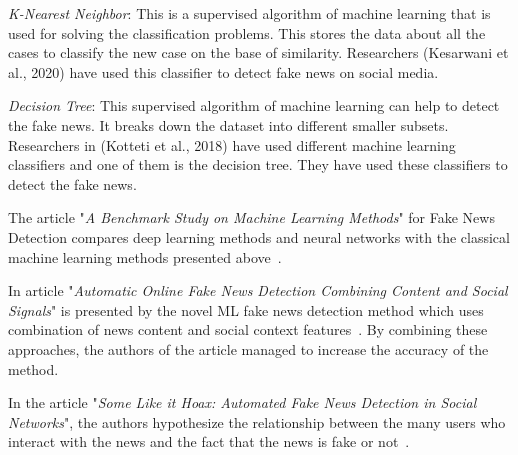 \textit{K-Nearest Neighbor}: This is a supervised algorithm of machine learning that is used for solving the classification problems.
This stores the data about all the cases to classify the new case on the base of similarity.
Researchers (Kesarwani et al., 2020) have used this classifier to detect fake news on social media.

\textit{Decision Tree}: This supervised algorithm of machine learning can help to detect the fake news.
It breaks down the dataset into different smaller subsets.
Researchers in (Kotteti et al., 2018) have used different machine learning classifiers and one of them is the decision tree.
They have used these classifiers to detect the fake news.

The article "\textit{A Benchmark Study on Machine Learning Methods}" for Fake News Detection compares deep learning methods and neural networks with the classical machine learning methods presented above~\cite{7}.

In article "\textit{Automatic Online Fake News Detection Combining Content and Social Signals}" is presented by the novel ML fake news detection method which uses combination of news content and social context features~\cite{5}.
By combining these approaches, the authors of the article managed to increase the accuracy of the method.

In the article "\textit{Some Like it Hoax: Automated Fake News Detection in Social Networks}", the authors hypothesize the relationship between the many users who interact with the news and the fact that the news is fake or not~\cite{6}.
